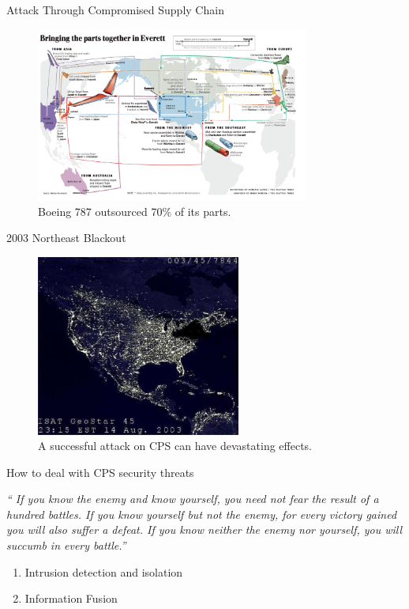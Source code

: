\documentclass[10pt]{beamer}
\begin{document}
\begin{frame}{Attack Through Compromised Supply Chain}
  \begin{figure}[ht]
    \centering
    \includegraphics[width=0.8\textwidth]{boeing.jpg}
    \caption{Boeing 787 outsourced 70\% of its parts.}
  \end{figure}
\end{frame}

\begin{frame}{2003 Northeast Blackout}
  \begin{figure}[<+htpb+>]
    \begin{center}
      \includegraphics[width=0.60\textwidth]{blackout.jpg}
      \caption{A successful attack on CPS can have devastating effects.}
    \end{center}
  \end{figure}
\end{frame}

\begin{frame}{How to deal with CPS security threats}
  \begin{exampleblock}{}
    {\it `` If you know the enemy and know yourself, you need not fear the result of a hundred battles. If you know yourself but not the enemy, for every victory gained you will also suffer a defeat. If you know neither the enemy nor yourself, you will succumb in every battle.''}
    \vskip5mm
    \hspace*{}
  \end{exampleblock}

  \begin{enumerate}
  \item Intrusion detection and isolation
  \item Information Fusion 
  \end{enumerate}
\end{frame}
\end{document}
